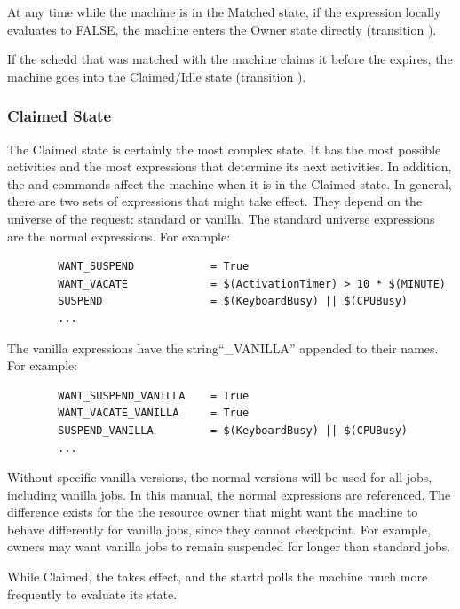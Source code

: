 At any time while the machine is in the Matched state, if the
 expression locally evaluates to FALSE, the machine enters
the Owner state directly (transition ).

If the schedd that was matched with the machine claims it before the
 expires, the machine goes into the Claimed/Idle
state (transition ).

\subsubsection{\label{sec:Claimed-State}Claimed State}

The Claimed state is certainly the most complex state.
It has the most possible activities and the most expressions that
determine its next activities.
In addition, the  and  commands affect
the machine when it is in the Claimed state.
In general, there are two sets of expressions that might take effect.
They depend on the universe of the request: standard or vanilla.
The standard universe expressions are the normal expressions.
For example:
\begin{verbatim}
        WANT_SUSPEND            = True
        WANT_VACATE             = $(ActivationTimer) > 10 * $(MINUTE)
        SUSPEND                 = $(KeyboardBusy) || $(CPUBusy)
        ...
\end{verbatim}

The vanilla expressions have the string``\_VANILLA'' appended to their names.
For example:
\begin{verbatim}
        WANT_SUSPEND_VANILLA    = True
        WANT_VACATE_VANILLA     = True
        SUSPEND_VANILLA         = $(KeyboardBusy) || $(CPUBusy)
        ...
\end{verbatim}

Without specific vanilla versions, the normal versions
will be used for all jobs, including vanilla jobs.  
In this manual, the normal expressions are referenced.
The difference exists for the
the resource owner that might want the machine
to behave differently for vanilla jobs, since they cannot checkpoint.
For example, owners may want vanilla jobs to remain suspended for
longer than standard jobs.

While Claimed, the  takes effect, and the
startd polls the machine much more frequently to evaluate its
state.

